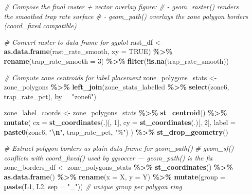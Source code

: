 \documentclass[
]{article}
\newenvironment{Shaded}{\begin{snugshade}}{\end{snugshade}}
\newcommand{\AttributeTok}[1]{\textcolor[rgb]{0.13,0.29,0.53}{#1}}
\newcommand{\CommentTok}[1]{\textcolor[rgb]{0.56,0.35,0.01}{\textit{#1}}}
\newcommand{\ConstantTok}[1]{\textcolor[rgb]{0.56,0.35,0.01}{#1}}
\newcommand{\DecValTok}[1]{\textcolor[rgb]{0.00,0.00,0.81}{#1}}
\newcommand{\FunctionTok}[1]{\textcolor[rgb]{0.13,0.29,0.53}{\textbf{#1}}}
\newcommand{\NormalTok}[1]{#1}
\newcommand{\OtherTok}[1]{\textcolor[rgb]{0.56,0.35,0.01}{#1}}
\newcommand{\SpecialCharTok}[1]{\textcolor[rgb]{0.81,0.36,0.00}{\textbf{#1}}}
\newcommand{\StringTok}[1]{\textcolor[rgb]{0.31,0.60,0.02}{#1}}
\begin{document}
\begin{Shaded}
\begin{Highlighting}[]
\CommentTok{\# Compose the final raster + vector overlay figure:}
\CommentTok{\#   {-} geom\_raster() renders the smoothed trap rate surface}
\CommentTok{\#   {-} geom\_path() overlays the zone polygon borders (coord\_fixed compatible)}

\CommentTok{\# Convert raster to data frame for ggplot}
\NormalTok{rast\_df }\OtherTok{\textless{}{-}} \FunctionTok{as.data.frame}\NormalTok{(rast\_rate\_smooth, }\AttributeTok{xy =} \ConstantTok{TRUE}\NormalTok{) }\SpecialCharTok{\%\textgreater{}\%}
  \FunctionTok{rename}\NormalTok{(}\AttributeTok{trap\_rate\_smooth =} \DecValTok{3}\NormalTok{) }\SpecialCharTok{\%\textgreater{}\%}
  \FunctionTok{filter}\NormalTok{(}\SpecialCharTok{!}\FunctionTok{is.na}\NormalTok{(trap\_rate\_smooth))}

\CommentTok{\# Compute zone centroids for label placement}
\NormalTok{zone\_polygons\_stats }\OtherTok{\textless{}{-}}\NormalTok{ zone\_polygons }\SpecialCharTok{\%\textgreater{}\%}
  \FunctionTok{left\_join}\NormalTok{(zone\_stats\_labelled }\SpecialCharTok{\%\textgreater{}\%} \FunctionTok{select}\NormalTok{(zone6, trap\_rate\_pct), }\AttributeTok{by =} \StringTok{"zone6"}\NormalTok{)}

\NormalTok{zone\_label\_coords }\OtherTok{\textless{}{-}}\NormalTok{ zone\_polygons\_stats }\SpecialCharTok{\%\textgreater{}\%}
  \FunctionTok{st\_centroid}\NormalTok{() }\SpecialCharTok{\%\textgreater{}\%}
  \FunctionTok{mutate}\NormalTok{(}
    \AttributeTok{cx    =} \FunctionTok{st\_coordinates}\NormalTok{(.)[, }\DecValTok{1}\NormalTok{],}
    \AttributeTok{cy    =} \FunctionTok{st\_coordinates}\NormalTok{(.)[, }\DecValTok{2}\NormalTok{],}
    \AttributeTok{label =} \FunctionTok{paste0}\NormalTok{(zone6, }\StringTok{"}\SpecialCharTok{\textbackslash{}n}\StringTok{"}\NormalTok{, trap\_rate\_pct, }\StringTok{"\%"}\NormalTok{)}
\NormalTok{  ) }\SpecialCharTok{\%\textgreater{}\%}
  \FunctionTok{st\_drop\_geometry}\NormalTok{()}

\CommentTok{\# Extract polygon borders as plain data frame for geom\_path()}
\CommentTok{\# geom\_sf() conflicts with coord\_fixed() used by ggsoccer — geom\_path() is the fix}
\NormalTok{zone\_borders\_df }\OtherTok{\textless{}{-}}\NormalTok{ zone\_polygons\_stats }\SpecialCharTok{\%\textgreater{}\%}
  \FunctionTok{st\_coordinates}\NormalTok{() }\SpecialCharTok{\%\textgreater{}\%}
  \FunctionTok{as.data.frame}\NormalTok{() }\SpecialCharTok{\%\textgreater{}\%}
  \FunctionTok{rename}\NormalTok{(}\AttributeTok{x =}\NormalTok{ X, }\AttributeTok{y =}\NormalTok{ Y) }\SpecialCharTok{\%\textgreater{}\%}
  \FunctionTok{mutate}\NormalTok{(}\AttributeTok{group =} \FunctionTok{paste}\NormalTok{(L1, L2, }\AttributeTok{sep =} \StringTok{"\_"}\NormalTok{))  }\CommentTok{\# unique group per polygon ring}


\end{Highlighting}
\end{Shaded}
\end{document}
